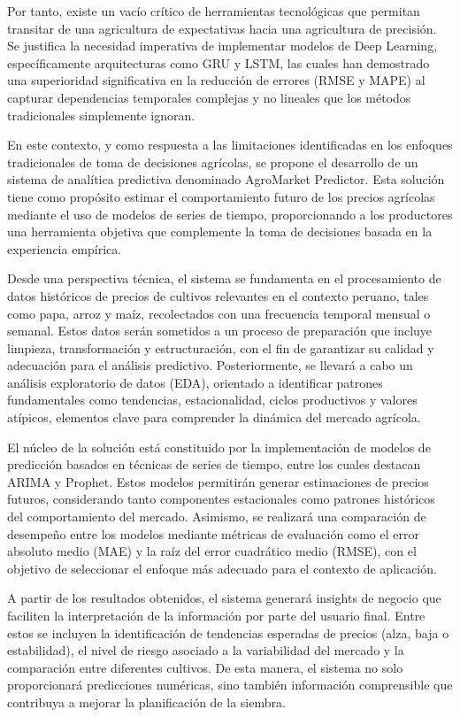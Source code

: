 \documentclass[12pt, a4paper]{report}
\begin{document}
Por tanto, existe un vacío crítico de herramientas tecnológicas que permitan transitar de una agricultura de expectativas hacia una agricultura de precisión. Se justifica la necesidad imperativa de implementar modelos de Deep Learning, específicamente arquitecturas como GRU y LSTM, las cuales han demostrado una superioridad significativa en la reducción de errores (RMSE y MAPE) al capturar dependencias temporales complejas y no lineales que los métodos tradicionales simplemente ignoran.


En este contexto, y como respuesta a las limitaciones identificadas en los enfoques tradicionales de toma de decisiones agrícolas, se propone el desarrollo de un sistema de analítica predictiva denominado AgroMarket Predictor. Esta solución tiene como propósito estimar el comportamiento futuro de los precios agrícolas mediante el uso de modelos de series de tiempo, proporcionando a los productores una herramienta objetiva que complemente la toma de decisiones basada en la experiencia empírica.

Desde una perspectiva técnica, el sistema se fundamenta en el procesamiento de datos históricos de precios de cultivos relevantes en el contexto peruano, tales como papa, arroz y maíz, recolectados con una frecuencia temporal mensual o semanal. Estos datos serán sometidos a un proceso de preparación que incluye limpieza, transformación y estructuración, con el fin de garantizar su calidad y adecuación para el análisis predictivo. Posteriormente, se llevará a cabo un análisis exploratorio de datos (EDA), orientado a identificar patrones fundamentales como tendencias, estacionalidad, ciclos productivos y valores atípicos, elementos clave para comprender la dinámica del mercado agrícola.

El núcleo de la solución está constituido por la implementación de modelos de predicción basados en técnicas de series de tiempo, entre los cuales destacan ARIMA y Prophet. Estos modelos permitirán generar estimaciones de precios futuros, considerando tanto componentes estacionales como patrones históricos del comportamiento del mercado. Asimismo, se realizará una comparación de desempeño entre los modelos mediante métricas de evaluación como el error absoluto medio (MAE) y la raíz del error cuadrático medio (RMSE), con el objetivo de seleccionar el enfoque más adecuado para el contexto de aplicación.

A partir de los resultados obtenidos, el sistema generará insights de negocio que faciliten la interpretación de la información por parte del usuario final. Entre estos se incluyen la identificación de tendencias esperadas de precios (alza, baja o estabilidad), el nivel de riesgo asociado a la variabilidad del mercado y la comparación entre diferentes cultivos. De esta manera, el sistema no solo proporcionará predicciones numéricas, sino también información comprensible que contribuya a mejorar la planificación de la siembra.
\end{document}

